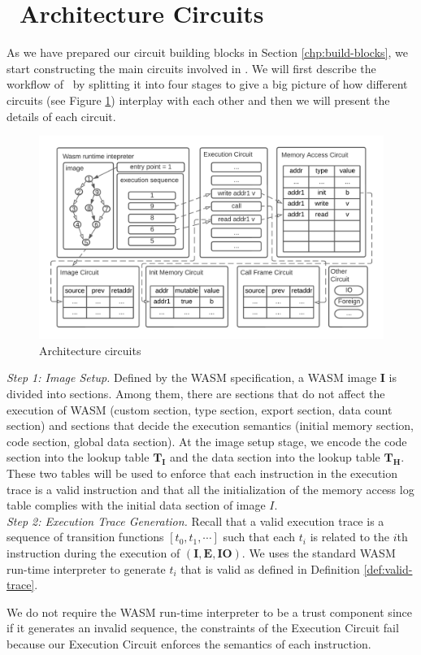 
\section{\zkwasm\ Architecture Circuits}
\label{chp:architecture-circuits}

As we have prepared our circuit building blocks in Section \ref{chp:build-blocks}, we start constructing the main circuits involved in \zkwasm. We will first describe the workflow of \zkwasm\, by splitting it into four stages to give a big picture of how different circuits (see Figure \ref{fig:arch-circuits}) interplay with each other and then we will present the details of each circuit.

\begin{figure}[!ht]
\centerline{
\includegraphics[scale=0.7]{figs/arch-circuits.png}
}
\caption{Architecture circuits}\label{fig:arch-circuits}
\end{figure}


\noindent\emph{Step 1: Image Setup.}
Defined by the WASM specification, a WASM image $\mathbf{I}$ is divided into sections. Among them, there are sections that do not affect the execution of WASM (custom section, type section, export section, data count section) and sections that decide the execution semantics (initial memory section, code section, global data section). At the image setup stage, we encode the code section into the lookup table $\mathbf{T}_\mathbf{I}$ and the data section into the lookup table $\mathbf{T}_\mathbf{H}$. These two tables will be used to enforce that each instruction in the execution trace is a valid instruction and that all the initialization of the memory access log table complies with the initial data section of image $I$.\\

\noindent\emph{Step 2: Execution Trace Generation.}
Recall that a valid execution trace is a sequence of transition functions $\left[t_0, t_1, \cdots\right]$ such that each $t_i$ is related to the 
$i$th instruction during the execution of $(\mathbf{I}, \mathbf{E}, \mathbf{IO})$. We uses the standard WASM run-time interpreter to generate ${t_i}$ that is valid as defined in Definition \ref{def:valid-trace}.
\begin{remark}
We do not require the WASM run-time interpreter to be a trust component since if it generates an invalid sequence, the constraints of the Execution Circuit fail because our Execution Circuit enforces the semantics of each instruction.
\end{remark}

